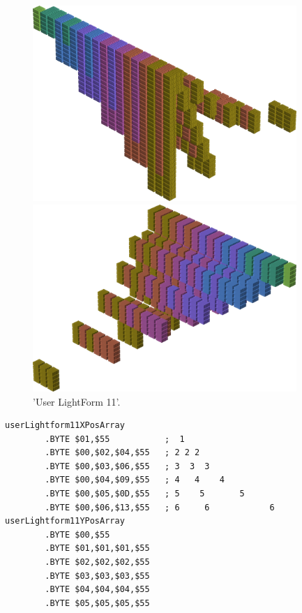 %
%
\begin{minipage}[b]{0.48\linewidth}
\begin{figure}[H]
    \centering
    \begin{adjustbox}{width=5cm,margin=0cm 0cm}
      \includegraphics[width=10cm]{src/colorspace_patterns/pattern19-45.png}%
    \end{adjustbox}
    \begin{adjustbox}{width=5cm,margin=0cm 0cm}
      \includegraphics[width=10cm]{src/colorspace_patterns/pattern19-225.png}%
    \end{adjustbox}
\caption{'User LightForm 11'.}
\end{figure}
\end{minipage}
\begin{minipage}[b]{0.48\linewidth}
\begin{lrbox}{\mybox}%
\begin{lstlisting}[basicstyle=\ttfamily\tiny,escapechar=\%]
userLightform11XPosArray
        .BYTE $01,$55           ;  1                  
        .BYTE $00,$02,$04,$55   ; 2 2 2               
        .BYTE $00,$03,$06,$55   ; 3  3  3             
        .BYTE $00,$04,$09,$55   ; 4   4    4          
        .BYTE $00,$05,$0D,$55   ; 5    5       5      
        .BYTE $00,$06,$13,$55   ; 6     6            6
userLightform11YPosArray
        .BYTE $00,$55
        .BYTE $01,$01,$01,$55
        .BYTE $02,$02,$02,$55
        .BYTE $03,$03,$03,$55
        .BYTE $04,$04,$04,$55
        .BYTE $05,$05,$05,$55
\end{lstlisting}
\end{lrbox}%
\scalebox{0.8}{\usebox{\mybox}}

\end{minipage}

